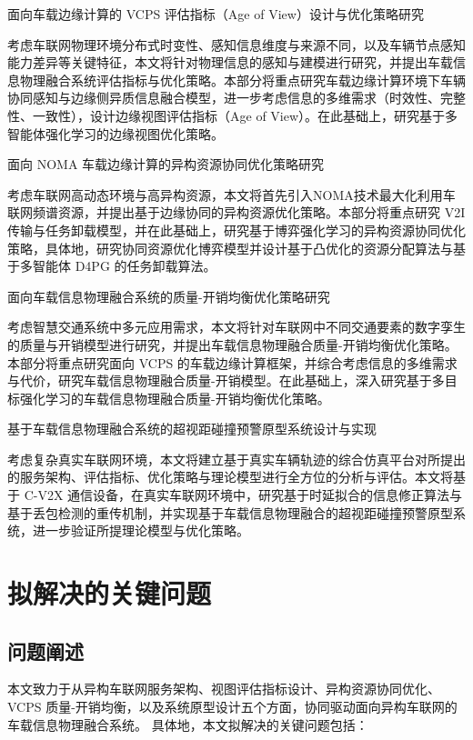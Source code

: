  面向车载边缘计算的 VCPS 评估指标（Age of View）设计与优化策略研究

考虑车联网物理环境分布式时变性、感知信息维度与来源不同，以及车辆节点感知能力差异等关键特征，本文将针对物理信息的感知与建模进行研究，并提出车载信息物理融合系统评估指标与优化策略。本部分将重点研究车载边缘计算环境下车辆协同感知与边缘侧异质信息融合模型，进一步考虑信息的多维需求（时效性、完整性、一致性），设计边缘视图评估指标（Age of View）。在此基础上，研究基于多智能体强化学习的边缘视图优化策略。

 面向 NOMA 车载边缘计算的异构资源协同优化策略研究

考虑车联网高动态环境与高异构资源，本文将首先引入NOMA技术最大化利用车联网频谱资源，并提出基于边缘协同的异构资源优化策略。本部分将重点研究 V2I 传输与任务卸载模型，并在此基础上，研究基于博弈强化学习的异构资源协同优化策略，具体地，研究协同资源优化博弈模型并设计基于凸优化的资源分配算法与基于多智能体 D4PG 的任务卸载算法。

 面向车载信息物理融合系统的质量-开销均衡优化策略研究

考虑智慧交通系统中多元应用需求，本文将针对车联网中不同交通要素的数字孪生的质量与开销模型进行研究，并提出车载信息物理融合质量-开销均衡优化策略。本部分将重点研究面向 VCPS 的车载边缘计算框架，并综合考虑信息的多维需求与代价，研究车载信息物理融合质量-开销模型。在此基础上，深入研究基于多目标强化学习的车载信息物理融合质量-开销均衡优化策略。

 基于车载信息物理融合系统的超视距碰撞预警原型系统设计与实现

考虑复杂真实车联网环境，本文将建立基于真实车辆轨迹的综合仿真平台对所提出的服务架构、评估指标、优化策略与理论模型进行全方位的分析与评估。本文将基于 C-V2X 通信设备，在真实车联网环境中，研究基于时延拟合的信息修正算法与基于丢包检测的重传机制，并实现基于车载信息物理融合的超视距碰撞预警原型系统，进一步验证所提理论模型与优化策略。

\section{拟解决的关键问题}\label{section 1-5}

\subsection{问题阐述}

本文致力于从异构车联网服务架构、视图评估指标设计、异构资源协同优化、VCPS 质量-开销均衡，以及系统原型设计五个方面，协同驱动面向异构车联网的车载信息物理融合系统。
具体地，本文拟解决的关键问题包括：

